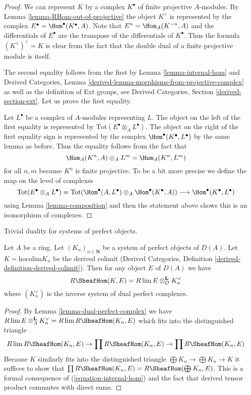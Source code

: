 \begin{proof}
We can represent $K$ by a complex $K^\bullet$ of finite projective
$A$-modules. By
Lemma \ref{lemma-RHom-out-of-projective} the object $K^\vee$
is represented by the complex $E^\bullet = \Hom^\bullet(K^\bullet, A)$.
Note that $E^n = \Hom_A(K^{-n}, A)$ and the differentials of
$E^\bullet$ are the transpose of the differentials of $K^\bullet$.
Thus the formula $(K^\vee)^\vee = K$ is clear from the fact that
the double dual of a finite projective module is itself.

\medskip\noindent
The second equality follows from the first by
Lemma \ref{lemma-internal-hom} and
Derived Categories, Lemma \ref{derived-lemma-morphisms-from-projective-complex}
as well as the definition of Ext groups, see
Derived Categories, Section \ref{derived-section-ext}.
Let us prove the first equality.

\medskip\noindent
Let $L^\bullet$ be a complex of $A$-modules representing $L$.
The object on the left of the first equality is represented by
$\text{Tot}(E^\bullet \otimes_A L^\bullet)$.
The object on the right of the first equality sign
is represented by the complex $\Hom^\bullet(K^\bullet, L^\bullet)$ by
the same lemma as before. Thus the equality follows from the
fact that
$$
\Hom_A(K^n, A) \otimes_A L^m = \Hom_A(K^n, L^m)
$$
for all $n, m$ because $K^n$ is finite projective.
To be a bit more precise we define the map on the level of complexes
$$
\text{Tot}(E^\bullet \otimes_A L^\bullet) =
\text{Tot}(\Hom^\bullet(A, L^\bullet) \otimes_A \Hom^\bullet(K^\bullet, A))
\longrightarrow
\Hom^\bullet(K^\bullet, L^\bullet)
$$
using Lemma \ref{lemma-composition} and then the statement above
shows this is an isomorphism of complexes.
\end{proof}

\begin{lemma}
\label{lemma-colim-and-lim-of-duals}
\begin{slogan}
Trivial duality for systems of perfect objects.
\end{slogan}
Let $A$ be a ring. Let $(K_n)_{n \in \mathbf{N}}$ be a system of
perfect objects of $D(A)$. Let $K = \text{hocolim} K_n$ be the derived colimit
(Derived Categories, Definition \ref{derived-definition-derived-colimit}).
Then for any object $E$ of $D(A)$ we have
$$
R\SheafHom(K, E) = R\lim E \otimes^\mathbf{L}_\mathcal{O} K_n^\vee
$$
where $(K_n^\vee)$ is the inverse system of dual perfect complexes.
\end{lemma}

\begin{proof}
By Lemma \ref{lemma-dual-perfect-complex} we have
$R\lim E \otimes^\mathbf{L}_A K_n^\vee =
R\lim R\SheafHom(K_n, E)$
which fits into the distinguished triangle
$$
R\lim R\SheafHom(K_n, E) \to
\prod R\SheafHom(K_n, E) \to
\prod R\SheafHom(K_n, E)
$$
Because $K$ similarly fits into the distinguished triangle
$\bigoplus K_n \to \bigoplus K_n \to K$ it suffices to show that
$\prod R\SheafHom(K_n, E) = R\SheafHom(\bigoplus K_n, E)$.
This is a formal consequence of (\ref{equation-internal-hom})
and the fact that derived tensor product commutes with direct sums.
\end{proof}

